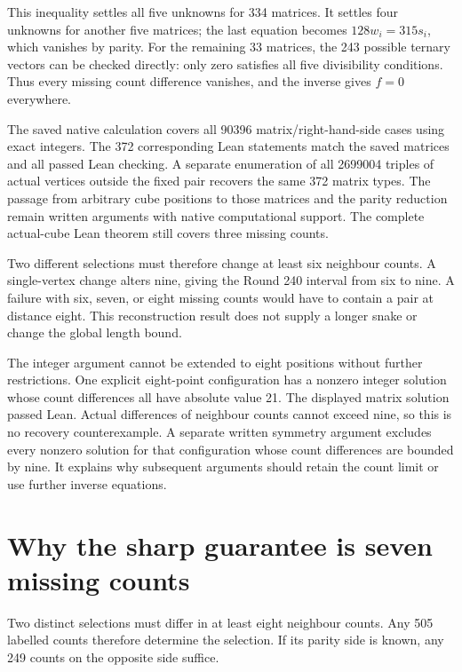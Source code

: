 \documentclass[11pt,a4paper]{article}
\begin{document}
This inequality settles all five unknowns for 334 matrices. It settles
four unknowns for another five matrices; the last equation becomes
$128w_i=315s_i$, which vanishes by parity. For the remaining 33 matrices,
the 243 possible ternary vectors can be checked directly: only zero
satisfies all five divisibility conditions. Thus every missing count
difference vanishes, and the inverse gives $f=0$ everywhere.

The saved native calculation covers all 90396 matrix/right-hand-side
cases using exact integers. The 372 corresponding Lean statements
match the saved matrices and all passed Lean checking. A separate
enumeration of all 2699004 triples of actual vertices outside the fixed
pair recovers the same 372 matrix types. The passage from arbitrary cube positions to those
matrices and the parity reduction remain written arguments with
native computational support. The complete actual-cube Lean theorem
still covers three missing counts.

Two different selections must therefore change at least six neighbour
counts. A single-vertex change alters nine, giving the Round 240 interval
from six to nine. A failure with six, seven, or eight missing counts would
have to contain a pair at distance eight. This reconstruction result
does not supply a longer snake or change the global length bound.


The integer argument cannot be extended to eight positions without
further restrictions. One explicit eight-point configuration has a
nonzero integer solution whose count differences all have absolute
value 21. The displayed matrix solution passed Lean. Actual differences
of neighbour counts cannot exceed nine, so this is no recovery
counterexample. A separate written symmetry argument excludes every
nonzero solution for that configuration whose count differences are
bounded by nine. It explains why subsequent
arguments should retain the count limit or use further inverse equations.

\section{Why the sharp guarantee is seven missing counts}
Two distinct selections must differ in at least eight neighbour counts.
Any 505 labelled counts therefore determine the selection. If its
parity side is known, any 249 counts on the opposite side suffice.
\end{document}

